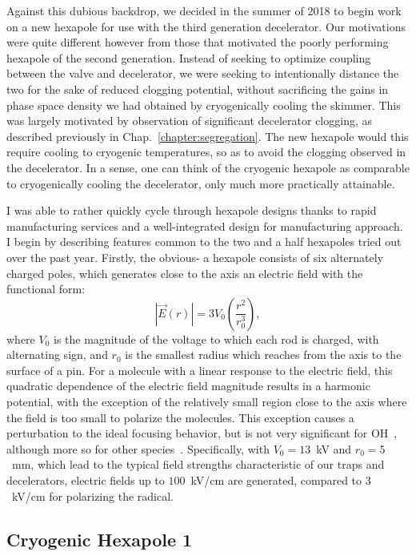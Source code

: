 Against this dubious backdrop, we decided in the summer of 2018 to begin work on a new hexapole for use with the third generation decelerator.
Our motivations were quite different however from those that motivated the poorly performing hexapole of the second generation.
Instead of seeking to optimize coupling between the valve and decelerator, we were seeking to intentionally distance the two for the sake of reduced clogging potential, without sacrificing the gains in phase space density we had obtained by cryogenically cooling the skimmer.
This was largely motivated by observation of significant decelerator clogging, as described previously in Chap.~\ref{chapter:segregation}.
The new hexapole would this require cooling to cryogenic temperatures, so as to avoid the clogging observed in the decelerator.
In a sense, one can think of the cryogenic hexapole as comparable to cryogenically cooling the decelerator, only much more practically attainable.

I was able to rather quickly cycle through hexapole designs thanks to rapid manufacturing services and a well-integrated design for manufacturing approach.
I begin by describing features common to the two and a half hexapoles tried out over the past year.
Firstly, the obvious- a hexapole consists of six alternately charged poles, which generates close to the axis an electric field with the functional form:
\begin{equation}
\left|\vec{E}(r)\right| = 3V_0\left(\frac{r^2}{r_0^3}\right),
\end{equation}
where $V_0$ is the magnitude of the voltage to which each rod is charged, with alternating sign, and $r_0$ is the smallest radius which reaches from the axis to the surface of a pin.
For a molecule with a linear response to the electric field, this quadratic dependence of the electric field magnitude results in a harmonic potential, with the exception of the relatively small region close to the axis where the field is too small to polarize the molecules.
This exception causes a perturbation to the ideal focusing behavior, but is not very significant for OH~\citep[Fig.~2b]{Bochinski2004}, although more so for other species~\citep[Fig.~1]{Kirste2013}.
Specifically, with $V_0=13$~kV and $r_0=5$~mm, which lead to the typical field strengths characteristic of our traps and decelerators, electric fields up to $100$~kV/cm are generated, compared to $3$~kV/cm for polarizing the radical.

\subsection{Cryogenic Hexapole 1}


